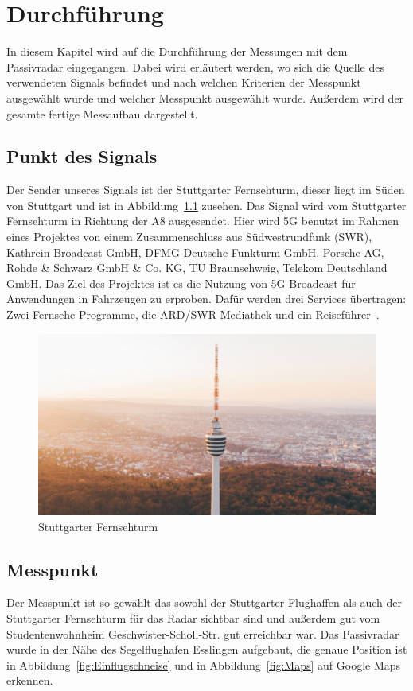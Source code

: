\chapter{Durchführung}
In diesem Kapitel wird auf die Durchführung der Messungen mit dem Passivradar eingegangen. Dabei wird erläutert werden, wo sich die Quelle des verwendeten Signals befindet und nach welchen Kriterien der Messpunkt ausgewählt wurde und welcher Messpunkt ausgewählt wurde. Außerdem wird der gesamte fertige Messaufbau dargestellt.
\section{Punkt des Signals}
Der Sender unseres Signals ist der Stuttgarter Fernsehturm, dieser liegt im Süden von Stuttgart und ist in Abbildung~\ref{fig:Fernsehturm} zusehen. Das Signal wird vom Stuttgarter Fernsehturm in Richtung der A8 ausgesendet. Hier wird 5G benutzt im Rahmen eines Projektes von einem Zusammenschluss aus Südwestrundfunk (SWR), Kathrein Broadcast GmbH,  DFMG  Deutsche Funkturm GmbH, Porsche AG, Rohde \& Schwarz GmbH \& Co. KG, TU Braunschweig, Telekom Deutschland GmbH. Das Ziel des Projektes ist es die Nutzung von 5G Broadcast für Anwendungen in Fahrzeugen zu erproben. Dafür werden drei Services übertragen: Zwei Fernsehe Programme, die ARD/SWR Mediathek und ein Reiseführer~\cite{5GMAG2020}.
\begin{figure}
    \centering
    \includegraphics[width=\textwidth]{images/Fernsehturm.jpg}
    \caption{Stuttgarter Fernsehturm}\label{fig:Fernsehturm}
\end{figure}

\section{Messpunkt}
Der Messpunkt ist so gewählt das sowohl der Stuttgarter Flughaffen als auch der Stuttgarter Fernsehturm für das Radar sichtbar sind und außerdem gut vom Studentenwohnheim Geschwister-Scholl-Str. gut erreichbar war. Das Passivradar wurde in der Nähe des Segelflughafen Esslingen aufgebaut, die genaue Position ist in Abbildung~\ref{fig:Einflugschneise} und in Abbildung~\ref{fig:Maps} auf Google Maps erkennen.

